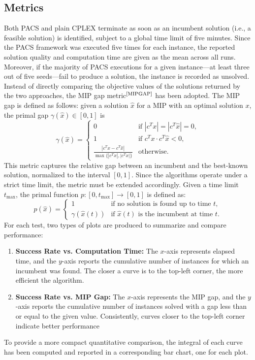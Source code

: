 \subsection{Metrics}
Both PACS and plain CPLEX terminate as soon as an incumbent solution (i.e., a feasible solution) is identified, subject to a global time limit of five minutes.
Since the PACS framework was executed five times for each instance, the reported solution quality and computation time are given as the mean across all runs.
Moreover, if the majority of PACS executions for a given instance---at least three out of five seeds---fail to produce a solution, the instance is recorded as unsolved.
Instead of directly comparing the objective values of the solutions returned by the two approaches, the MIP gap metric$^\text{\cite{MIPGAP}}$ has been adopted. The MIP gap is defined as follows: given a solution $\hat{x}$ for a MIP with an optimal solution $x$, the primal gap $\gamma(\hat{x}) \in [0,1]$ is
\begin{equation}
\gamma(\hat{x}) =
\begin{cases}
0 & \text{if } |c^T x| = |c^T \hat{x}| = 0, \\
1 & \text{if } c^T x \cdot c^T \hat{x}< 0, \\
\frac{|c^T x-c^T \hat{x}|}{\max\{|c^T \hat{x}|, |c^T x|\}} & \text{otherwise}.
\end{cases}
\end{equation}
This metric captures the relative gap between an incumbent and the best-known solution, normalized to the interval $[0,1]$.  
Since the algorithms operate under a strict time limit, the metric must be extended accordingly. Given a time limit $t_{\max}$, the primal function $p:[0,t_{\max}] \to [0,1]$ is defined as:
\begin{equation}
p(\hat{x}) =
\begin{cases}
1 & \text{if no solution is found up to time $t$}, \\
\gamma(\hat{x}(t)) & \text{if $\hat{x}(t)$ is the incumbent at time $t$}.
\end{cases}
\end{equation}
For each test, two types of plots are produced to summarize and compare performance:
\begin{enumerate}
    \item \textbf{Success Rate vs. Computation Time:}  
    The $x$-axis represents elapsed time, and the $y$-axis reports the cumulative number of instances for which an incumbent was found. The closer a curve is to the top-left corner, the more efficient the algorithm.  
    \item \textbf{Success Rate vs. MIP Gap:}  
    The $x$-axis represents the MIP gap, and the $y$-axis reports the cumulative number of instances solved with a gap less than or equal to the given value. Consistently, curves closer to the top-left corner indicate better performance 
\end{enumerate}
To provide a more compact quantitative comparison, the integral of each curve has been computed and reported in a corresponding bar chart, one for each plot.

